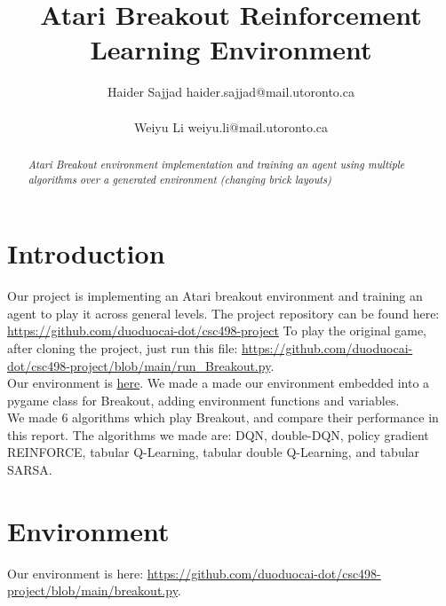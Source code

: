 \documentclass[twoside,11pt]{article}
\title{Atari Breakout Reinforcement Learning Environment}
\author{\name Haider Sajjad \email haider.sajjad@mail.utoronto.ca \\
       \addr 1004076251\\
       \AND
      \name Weiyu Li \email weiyu.li@mail.utoronto.ca \\
       \addr 1003765981}
\begin{document}
\maketitle

\begin{abstract}%
\textit{
Atari Breakout environment implementation and training an agent using multiple algorithms over a generated environment (changing brick layouts)}

\end{abstract}

\section{Introduction}
Our project is implementing an Atari breakout environment and training an agent to play it across general levels. The project repository can be found here: \url{https://github.com/duoduocai-dot/csc498-project} To play the original game, after cloning the project, just run this file: \url{https://github.com/duoduocai-dot/csc498-project/blob/main/run_Breakout.py}.\\
Our environment is \href{https://github.com/duoduocai-dot/csc498-project/blob/main/breakout.py}{here}. We made a made our environment embedded into a pygame class for Breakout, adding environment functions and variables. \\
We made 6 algorithms which play Breakout, and compare their performance in this report. The algorithms we made are: DQN, double-DQN, policy gradient REINFORCE, tabular Q-Learning, tabular double Q-Learning, and tabular SARSA.

\section{Environment}
Our environment is here: \url{https://github.com/duoduocai-dot/csc498-project/blob/main/breakout.py}.
\end{document}
